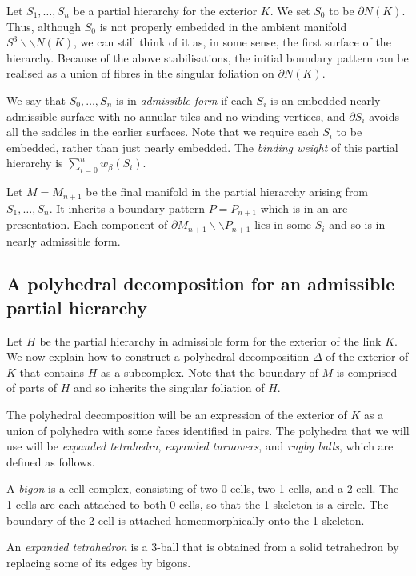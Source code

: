\documentclass[oneside]{amsart}
\numberwithin{equation}{section}
\theoremstyle{plain}
\theoremstyle{definition}
\newcommand{\cut}{\backslash\backslash}
\begin{document}
Let $S_1, \dots, S_n$ be a partial hierarchy for the exterior $K$. 
We set $S_0$ to be $\partial N(K)$. Thus, although $S_0$ is not properly
embedded in the ambient manifold $S^3 \cut N(K)$, we can
still think of it as, in some sense, the first surface of the hierarchy.
Because of the above stabilisations, the initial boundary pattern can be realised
as a union of fibres in the singular foliation on $\partial N(K)$.

We say that $S_0, \dots, S_n$ is in \emph{admissible form} if each $S_i$
is an embedded nearly admissible surface with no annular tiles and no winding vertices,
and $\partial S_i$ avoids all the saddles in the earlier surfaces.
Note that we require each $S_i$ to be embedded, rather than just nearly embedded.
The \emph{binding weight} of this partial hierarchy is $\sum_{i=0}^n w_\beta(S_i)$.

Let $M = M_{n+1}$ be the final manifold in the partial hierarchy arising from $S_1, \dots, S_n$.
It inherits a boundary pattern $P = P_{n+1}$ which is in an arc presentation.
Each component of $\partial M_{n+1} \cut P_{n+1}$
lies in some $S_i$ and so is in nearly admissible form.

\subsection{A polyhedral decomposition for an admissible partial hierarchy}
\label{Subsec:TriangulatingExterior}

Let $H$ be the partial hierarchy in admissible form for the exterior of the link $K$. 
We now explain how to construct a polyhedral decomposition $\Delta$
of the exterior of $K$ that contains $H$ as a subcomplex. Note that the boundary of $M$ is comprised of parts of $H$ and so inherits 
the singular foliation of $H$.

The polyhedral decomposition will be an expression of the exterior of $K$ as a union of polyhedra with some faces
identified in pairs. The polyhedra that we will use will be \emph{expanded tetrahedra}, \emph{expanded turnovers},
and \emph{rugby balls}, which are defined as follows.

A \emph{bigon} is a cell complex, consisting of two 0-cells, two 1-cells, and a 2-cell.
The 1-cells are each attached to both 0-cells, so that the 1-skeleton is a circle.
The boundary of the 2-cell is attached homeomorphically onto the 1-skeleton.

An \emph{expanded tetrahedron} is a 3-ball that is obtained from a solid tetrahedron by replacing
some of its edges by bigons. 
\end{document}
